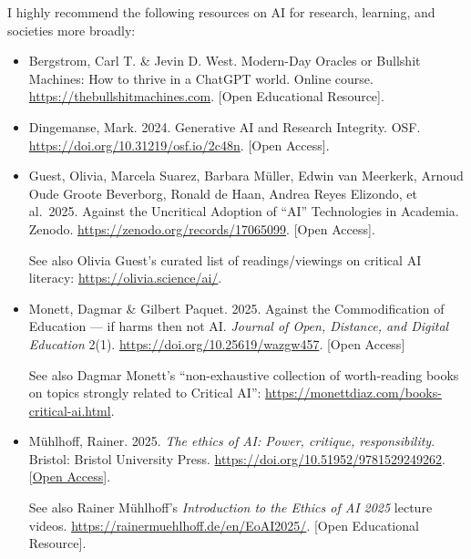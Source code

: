 \documentclass[
  letterpaper,
  DIV=11,
  numbers=noendperiod]{scrreprt}
\begin{document}
\begin{tcolorbox}[enhanced jigsaw, arc=.35mm, bottomrule=.15mm, bottomtitle=1mm, breakable, colback=white, colbacktitle=quarto-callout-note-color!10!white, colframe=quarto-callout-note-color-frame, coltitle=black, left=2mm, leftrule=.75mm, opacityback=0, opacitybacktitle=0.6, rightrule=.15mm, title=\textcolor{quarto-callout-note-color}{\faInfo}\hspace{0.5em}{More food for thought \emoji{green-apple} \emoji{apple}}, titlerule=0mm, toprule=.15mm, toptitle=1mm]

I highly recommend the following resources on AI for research, learning,
and societies more broadly:

\begin{itemize}
\item
  Bergstrom, Carl T. \& Jevin D. West. Modern-Day Oracles or Bullshit
  Machines: How to thrive in a ChatGPT world. Online course.
  \url{https://thebullshitmachines.com}. {[}Open Educational
  Resource{]}.
\item
  Dingemanse, Mark. 2024. Generative AI and Research Integrity. OSF.
  \url{https://doi.org/10.31219/osf.io/2c48n}. {[}Open Access{]}.
\item
  Guest, Olivia, Marcela Suarez, Barbara Müller, Edwin van Meerkerk,
  Arnoud Oude Groote Beverborg, Ronald de Haan, Andrea Reyes Elizondo,
  et al.~2025. Against the Uncritical Adoption of ``AI'' Technologies in
  Academia. Zenodo. \url{https://zenodo.org/records/17065099}. {[}Open
  Access{]}.

   See also Olivia Guest's curated list of
  readings/viewings on critical AI literacy:
  \url{https://olivia.science/ai/}.
\item
  Monett, Dagmar \& Gilbert Paquet. 2025. Against the Commodification of
  Education --- if harms then not AI. \emph{Journal of Open, Distance,
  and Digital Education} 2(1). \url{https://doi.org/10.25619/wazgw457}.
  {[}Open Access{]}

   See also Dagmar Monett's ``non-exhaustive
  collection of worth-reading books on topics strongly related to
  Critical AI'': \url{https://monettdiaz.com/books-critical-ai.html}.
\item
  Mühlhoff, Rainer. 2025. \emph{The ethics of AI: Power, critique,
  responsibility}. Bristol: Bristol University Press.
  \url{https://doi.org/10.51952/9781529249262}.
  {[}\href{https://bristoluniversitypressdigital.com/downloadpdf/monobook-oa/book/9781529249262/9781529249262.pdf}{Open
  Access}{]}.

   See also Rainer Mühlhoff's \emph{Introduction to
  the Ethics of AI 2025} lecture videos.
  \hyperref[0]{https://rainermuehlhoff.de/en/EoAI2025/}. {[}Open
  Educational Resource{]}.
\end{itemize}

\end{tcolorbox}
\end{document}
